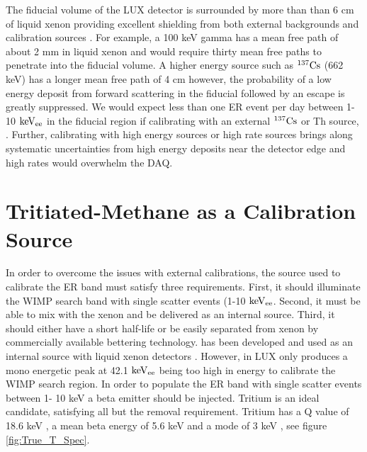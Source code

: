 The fiducial volume of the LUX detector is surrounded by more than than 6 cm of liquid xenon providing excellent shielding from both external backgrounds and calibration sources \cite{LUX_BG}. For example, a 100 keV gamma has a mean free path of about 2 mm in liquid xenon and would require thirty mean free paths to penetrate into the fiducial volume. A higher energy source such as $\rm ^{137}Cs$ (662 keV) has a longer mean free path of 4 cm however, the probability of a low energy deposit from forward scattering in the fiducial followed by an escape is greatly suppressed. We would expect less than one ER event per day between 1-10 $\rm keV_{ee}$ in the fiducial region if calibrating with an external $\rm ^{137}Cs$ or Th source, \cite{LUX_BG}. Further, calibrating with high energy sources or high rate sources brings along systematic uncertainties from high energy deposits near the detector edge and high rates would overwhelm the DAQ.  

\section{Tritiated-Methane as a Calibration Source}
In order to overcome the issues with external calibrations, the source used to calibrate the ER band must satisfy three requirements. First, it should illuminate the WIMP search band with single scatter events (1-10 $\rm keV_{ee}$. Second, it must be able to mix with the xenon and be delivered as an internal source. Third, it should either have a short half-life or be easily separated from xenon by commercially available bettering technology. \KrCal has been developed and used as an internal source with liquid xenon detectors \cite{Kastens} \cite{Baudis}. However, in LUX \KrCal only produces a mono energetic peak at 42.1 $\rm keV_{ee}$ being too high in energy to calibrate the WIMP search region. In order to populate the ER band with single scatter events between 1- 10 keV a beta emitter should be injected. Tritium is an ideal candidate, satisfying all but the removal requirement. Tritium has a Q value of 18.6 keV \cite{Tritium_Q}, a mean beta energy of 5.6 keV \cite{Tritium_Mean} and a mode of 3 keV \cite{Tritium_Eq}, see figure \ref{fig:True_T_Spec}.


